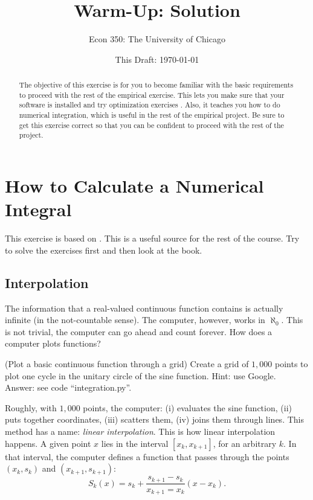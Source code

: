 



\title{Warm-Up: Solution}
\author{Econ 350: The University of Chicago}
\date{This Draft: \today}
\maketitle

\begin{abstract}
\noindent The objective of this exercise is for you to become familiar with the basic requirements to proceed with the rest of the empirical exercise. This lets you make sure that your software is installed and try optimization exercises . Also, it teaches you how to do numerical integration, which is useful in the rest of the empirical project. Be sure to get this exercise correct so that you can be confident to proceed with the rest of the project. 
\end{abstract}

\section{How to Calculate a Numerical Integral}
This exercise is based on \citet{langtangen2011primer}. This is a useful source for the rest of the course. Try to solve the exercises first and then look at the book.

\subsection{Interpolation}
The information that a real-valued continuous function contains is actually infinite (in the not-countable sense). The computer, however, works in $\aleph_{0}$. This is not trivial, the computer can go ahead and count forever. How does a computer plots functions?
\begin{exercise} (Plot a basic continuous function through a grid) \label{function:grid}
Create a grid of $1,000$ points to plot one cycle in the unitary circle of the sine function. Hint: use Google.\\
\noindent Answer: see code ``integration.py''.
\end{exercise} 

\indent Roughly, with $1,000$ points, the computer: (i) evaluates the sine function, (ii) puts together coordinates, (iii) scatters them, (iv) joins them through lines. This method has a name: \emph{linear interpolation}. This is how linear interpolation happens. A given point $x$ lies in the interval $[x_{k},x_{k+1}]$, for an arbitrary $k$. In that interval, the computer defines a function that passes through the points $(x_{k},s_{k})$ and $(x_{k+1},s_{k+1})$:
\begin{equation}
S_{k}(x) = s_{k} + \frac{s_{k+1} - s_{k}}{x_{k+1} = x_{k}} (x - x_{k}). \label{eq:interpol}
\end{equation}

